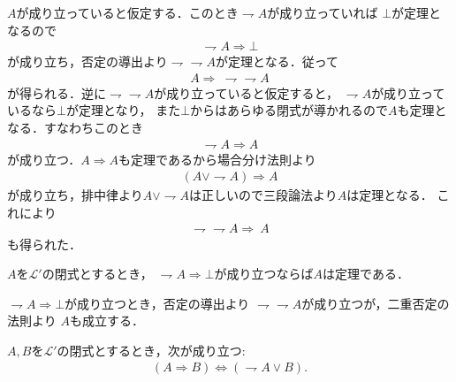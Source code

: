 	\begin{prf}
		$A$が成り立っていると仮定する．このとき$\rightharpoondown A$が成り立っていれば
		$\bot$が定理となるので
		\begin{align}
			\rightharpoondown A \Longrightarrow \bot
		\end{align}
		が成り立ち，否定の導出より$\rightharpoondown \rightharpoondown A$が定理となる．従って
		\begin{align}
			A \Longrightarrow\ \rightharpoondown \rightharpoondown A
		\end{align}
		が得られる．逆に$\rightharpoondown \rightharpoondown A$が成り立っていると仮定すると，
		$\rightharpoondown A$が成り立っているなら$\bot$が定理となり，
		また$\bot$からはあらゆる閉式が導かれるので$A$も定理となる．すなわちこのとき
		\begin{align}
			\rightharpoondown A \Longrightarrow A
		\end{align}
		が成り立つ．$A \Longrightarrow A$も定理であるから場合分け法則より
		\begin{align}
			(A \vee \rightharpoondown A) \Longrightarrow A
		\end{align}
		が成り立ち，排中律より$A \vee \rightharpoondown A$は正しいので三段論法より$A$は定理となる．
		これにより
		\begin{align}
			\rightharpoondown \rightharpoondown A \Longrightarrow\ A
		\end{align}
		も得られた．
		\QED
	\end{prf}
	
	\begin{screen}
		\begin{metathm}[背理法の原理]
			$A$を$\mathcal{L}'$の閉式とするとき，
			$\rightharpoondown A \Longrightarrow \bot$が成り立つならば$A$は定理である．
		\end{metathm}
	\end{screen}
	
	\begin{prf}
		$\rightharpoondown A \Longrightarrow \bot$が成り立つとき，否定の導出より
		$\rightharpoondown \rightharpoondown A$が成り立つが，二重否定の法則より
		$A$も成立する．
		\QED
	\end{prf}
	
	\begin{screen}
		\begin{metathm}[ならばとまたは]\label{metathm:rule_of_inference_3}
			$A,B$を$\mathcal{L}'$の閉式とするとき，次が成り立つ:
			\begin{align}
				(A \Longrightarrow B) \Longleftrightarrow (\rightharpoondown A \vee B).
			\end{align}
		\end{metathm}
	\end{screen}
	
